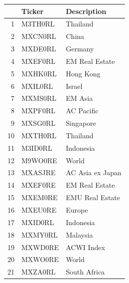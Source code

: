 \documentclass[11pt,preprint, authoryear]{elsarticle}
\let\origtable\table
\let\endorigtable\endtable
\renewenvironment{table}[1][2] {
    \expandafter\origtable\expandafter[H]
} {
    \endorigtable
}
\numberwithin{equation}{section}
\numberwithin{figure}{section}
\numberwithin{table}{section}
\begin{document}
\begin{table}[H]
\centering
\begin{tabular}{rll}
  \hline
 & Ticker & Description \\ 
  \hline
1 & M3TH0RL & Thailand \\ 
  2 & MXCN0RL & China \\ 
  3 & MXDE0RL & Germany \\ 
  4 & MXEF0RL & EM Real Estate \\ 
  5 & MXHK0RL & Hong Kong \\ 
  6 & MXIL0RL & Israel \\ 
  7 & MXMS0RL & EM Asia \\ 
  8 & MXPF0RL & AC Pacific \\ 
  9 & MXSG0RL & Singapore \\ 
  10 & MXTH0RL & Thailand \\ 
  11 & M3ID0RL & Indonesia \\ 
  12 & M9WO0RE & World \\ 
  13 & MXASJRE & AC Asia ex Japan \\ 
  14 & MXEF0RE & EM Real Estate \\ 
  15 & MXEM0RE & EMU Real Estate \\ 
  16 & MXEU0RE & Europe \\ 
  17 & MXID0RL & Indonesia \\ 
  18 & MXMY0RL & Malaysia \\ 
  19 & MXWD0RE & ACWI Index \\ 
  20 & MXWO0RE & World \\ 
  21 & MXZA0RL & South Africa \\ 
   \hline
\end{tabular}
\caption{Asset description Table \label{tab1}} 
\end{table}
\end{document}

